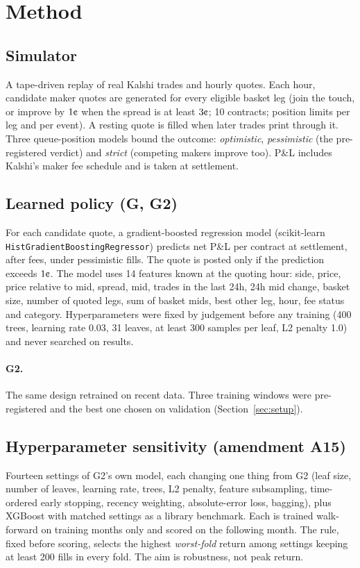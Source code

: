 \documentclass[11pt,a4paper]{article}
\newcommand{\cent}{\text{\textcent}}
\begin{document}
\section{Method}

\subsection{Simulator}
A tape-driven replay of real Kalshi trades and hourly quotes. Each hour, candidate maker quotes are generated
for every eligible basket leg (join the touch, or improve by $1\cent$ when the spread is at least $3\cent$;
10 contracts; position limits per leg and per event). A resting quote is filled when later trades print through
it. Three queue-position models bound the outcome: \emph{optimistic}, \emph{pessimistic} (the pre-registered
verdict) and \emph{strict} (competing makers improve too). P\&L includes Kalshi's maker fee schedule and is
taken at settlement.

\subsection{Learned policy (G, G2)}
For each candidate quote, a gradient-boosted regression model (scikit-learn
\texttt{HistGradient\allowbreak{}Boosting\allowbreak{}Regressor}) predicts net P\&L per contract at settlement,
after fees, under pessimistic fills. The quote is posted only if the prediction exceeds $1\cent$. The model uses
14 features known at the quoting hour: side, price, price relative to mid, spread, mid, trades in the last 24h,
24h mid change, basket size, number of quoted legs, sum of basket mids, best other leg, hour, fee status and
category. Hyperparameters were fixed by judgement before any training (400 trees, learning rate 0.03, 31 leaves,
at least 300 samples per leaf, L2 penalty 1.0) and never searched on results.

\paragraph{G2.} The same design retrained on recent data. Three training windows were pre-registered and the
best one chosen on validation (Section~\ref{sec:setup}).

\subsection{Hyperparameter sensitivity (amendment A15)}
Fourteen settings of G2's own model, each changing one thing from G2 (leaf size, number of leaves, learning
rate, trees, L2 penalty, feature subsampling, time-ordered early stopping, recency weighting, absolute-error
loss, bagging), plus XGBoost with matched settings as a library benchmark. Each is trained walk-forward on
training months only and scored on the following month. The rule, fixed before scoring, selects the highest
\emph{worst-fold} return among settings keeping at least 200 fills in every fold. The aim is robustness, not peak
return.
\end{document}

